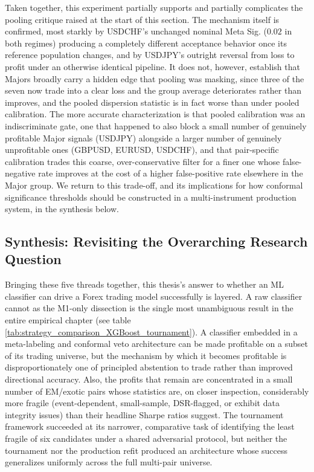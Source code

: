 \documentclass[12pt, a4paper]{article}
\begin{document}
Taken together, this experiment partially supports and partially complicates the pooling critique raised at the start of this section. The mechanism itself is 
confirmed, most starkly by USDCHF's unchanged nominal Meta Sig. ($0.02$ in both regimes) producing a completely different acceptance behavior once its reference 
population changes, and by USDJPY's outright reversal from loss to profit under an otherwise identical pipeline. It does not, however, establish that Majors 
broadly carry a hidden edge that pooling was masking, since three of the seven now trade into a clear loss and the group average deteriorates rather than 
improves, and the pooled dispersion statistic is in fact worse than under pooled calibration. The more accurate characterization is that pooled calibration was an 
indiscriminate gate, one that happened to also block a small number of genuinely profitable Major signals (USDJPY) alongside a larger number of genuinely 
unprofitable ones (GBPUSD, EURUSD, USDCHF), and that pair-specific calibration trades this coarse, over-conservative filter for a finer one whose false-negative 
rate improves at the cost of a higher false-positive rate elsewhere in the Major group. We return to this trade-off, and its implications for how conformal 
significance thresholds should be constructed in a multi-instrument production system, in the synthesis below.


\subsection{Synthesis: Revisiting the Overarching Research Question}

Bringing these five threads together, this thesis's answer to whether an ML classifier can drive a Forex trading model successfully is layered. A raw classifier cannot as the M1-only 
dissection is the single most unambiguous result in the entire empirical chapter (see table \ref{tab:strategy_comparison_XGBoost_tournament}). A classifier embedded in a meta-labeling 
and conformal veto architecture can be made profitable on a subset of its trading universe, but the mechanism by which it becomes profitable is disproportionately one of principled 
abstention to trade rather than improved directional accuracy. Also, the profits that remain are concentrated in a small number of EM/exotic pairs whose statistics are, on closer 
inspection, considerably more fragile (event-dependent, small-sample, DSR-flagged, or exhibit data integrity issues) than their headline Sharpe ratios suggest. The tournament 
framework succeeded at its narrower, comparative task of identifying the least fragile of six candidates under a shared adversarial protocol, but neither the tournament nor the 
production refit produced an architecture whose success generalizes uniformly across the full multi-pair universe.
\end{document}
